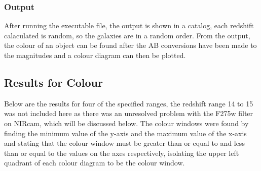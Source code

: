 			\subsubsection{Output} %
			\label{ssub:output}
				After running the executable file, the output is shown in a catalog, each redshift calaculated is random, so the galaxies are in a random order. From the output, the colour of an object can be found after the AB conversions have been made to the magnitudes and a colour diagram can then be plotted.


	\subsection{Results for Colour} %
	\label{sub:Results_for_Colour}
		Below are the results for four of the specified ranges, the redshift range 14 to 15 was not included here as there was an unresolved problem with the F275w filter on NIRcam, which will be discussed below. The colour windows were found by finding the minimum value of the y-axis and the maximum value of the x-axis and stating that the colour window must be greater than or equal to and less than or equal to the values on the axes respectively, isolating the upper left quadrant of each colour diagram to be the colour window.
